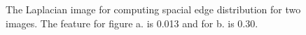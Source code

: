 \documentclass[conference,a4paper]{IEEEtran}
\begin{document}
\begin{figure}
{  }
  \caption{
  The Laplacian image for computing spacial edge distribution for two images.  The feature for figure a. is 0.013 and for b. is 0.30.
  }
  \label{fig:sed}
\end{figure}
\end{document}
